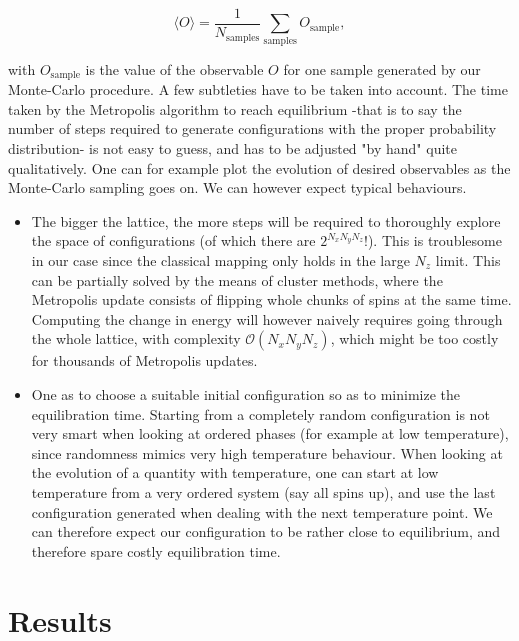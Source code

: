 \documentclass[11pt,openany]{article}
\begin{document}
\begin{equation}
	\langle O\rangle = \frac{1}{N_\mathrm{samples}}\sum_\mathrm{samples} O_\mathrm{sample},
\end{equation}

with $O_\mathrm{sample}$ is the value of the observable $O$ for one sample generated by our Monte-Carlo procedure. A few subtleties have to be taken into account. The time taken by the Metropolis algorithm to reach equilibrium -that is to say the number of steps required to generate configurations with the proper probability distribution- is not easy to guess, and has to be adjusted "by hand" quite qualitatively. One can for example plot the evolution of desired observables as the Monte-Carlo sampling goes on. We can however expect typical behaviours.

\begin{itemize}
	
	\item The bigger the lattice, the more steps will be required to thoroughly explore the space of configurations (of which there are $2^{N_xN_yN_z}$!). This is troublesome in our case since the classical mapping only holds in the large $N_z$ limit. This can be partially solved by the means of cluster methods, where the Metropolis update consists of flipping whole chunks of spins at the same time. Computing the change in energy will however naively requires going through the whole lattice, with complexity $\mathcal{O}\left(N_xN_yN_z\right)$, which might be too costly for thousands of Metropolis updates.
	
	\item One as to choose a suitable initial configuration so as to minimize the equilibration time. Starting from a completely random configuration is not very smart when looking at ordered phases (for example at low temperature), since randomness mimics very high temperature behaviour. When looking at the evolution of a quantity with temperature, one can start at low temperature from a very ordered system (say all spins up), and use the last configuration generated when dealing with the next temperature point. We can therefore expect our configuration to be rather close to equilibrium, and therefore spare costly equilibration time.
	
\end{itemize}


\section{Results}
\end{document}
